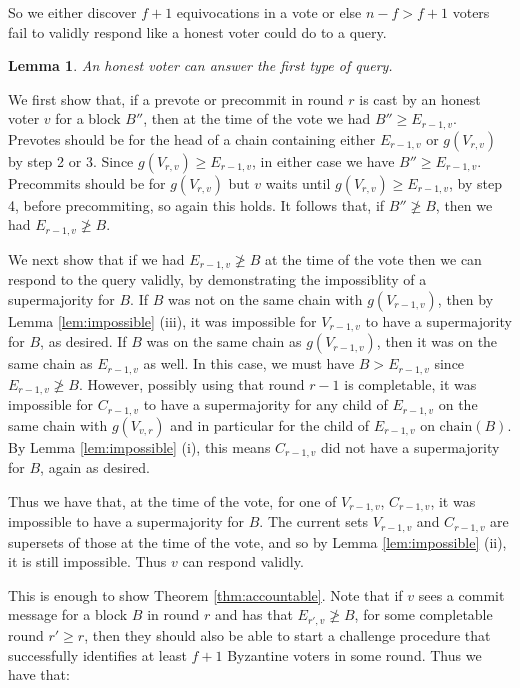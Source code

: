 \documentclass{article}
\newtheorem{lemma}[theorem]{Lemma}
\begin{document}
So we either discover $f+1$ equivocations in a vote or else $n-f > f+1$ voters fail to validly respond like a honest voter could do to a query.


\begin{lemma} \label{lem:honest-answer}
An honest voter can answer the first type of query.
\end{lemma}
We first show that, if a prevote or precommit in round $r$ is cast by an honest voter $v$ for a block $B''$, then at the time of the vote we had $B'' \geq E_{r-1,v}$.
Prevotes should be for the head of a chain containing either $E_{r-1,v}$ or $g(V_{r,v})$ by step 2 or 3.  Since $g(V_{r,v}) \geq E_{r-1,v}$, in either case we have $B'' \geq E_{r-1,v}$. Precommits should be for $g(V_{r,v})$ but $v$ waits until $g(V_{r,v}) \geq E_{r-1,v}$, by step 4, before precommiting, so again this holds.
It follows that, if $B'' \not\geq B$, then we had $E_{r-1,v} \not\geq B$.

We next show that if we had $E_{r-1,v} \not\geq B$ at the time of the vote then we can respond to the query validly, by demonstrating the impossiblity of a supermajority for $B$. 
If $B$ was not on the same chain with $g(V_{r-1,v})$, then by Lemma \ref{lem:impossible} (iii), it was impossible for $V_{r-1,v}$ to have a supermajority for $B$, as desired. 
If $B$ was on the same chain as $g(V_{r-1,v})$, then it was on the same chain as $E_{r-1,v}$ as well.  In this case, we must have $B > E_{r-1,v}$ since $E_{r-1,v} \not\geq B$.
 However, possibly using that round $r-1$ is completable, it was impossible for $C_{r-1,v}$ to have a supermajority for any child of $E_{r-1,v}$ on the same chain with $g(V_{v,r})$ and in particular for the child of $E_{r-1,v}$ on $\textrm{chain}(B)$.
By Lemma \ref{lem:impossible} (i), this means $C_{r-1,v}$ did not have a supermajority for $B$, again as desired.

Thus we have that, at the time of the vote, for one of $V_{r-1,v}$, $C_{r-1,v}$, it was impossible to have a supermajority for $B$. The current sets $V_{r-1,v}$ and $C_{r-1,v}$ are supersets of those at the time of the vote, and so by Lemma \ref{lem:impossible} (ii), it is still impossible. Thus $v$ can respond validly.


This is enough to show Theorem \ref{thm:accountable}.  Note that if $v$ sees a commit message for a block $B$ in round $r$ and has that $E_{r',v} \not\geq B$, for some completable round $r' \geq r$, then they should also be able to start a challenge procedure that successfully identifies at least $f+1$ Byzantine voters in some round. Thus we have that:
\end{document}

